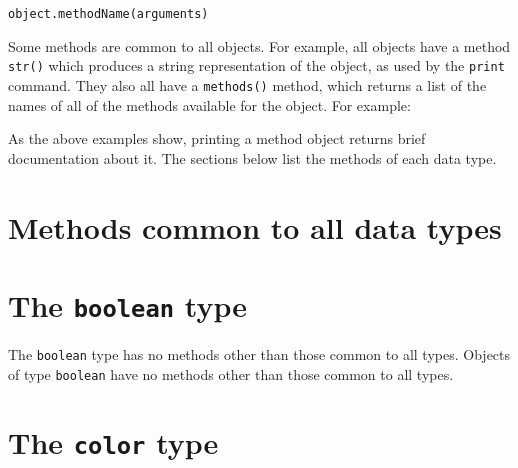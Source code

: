 \begin{verbatim}
object.methodName(arguments)
\end{verbatim}

\noindent Some methods are common to all objects. For example, all objects have
a method {\tt str()} which produces a string representation of the object, as
used by the {\tt print} command. They also all have a {\tt methods()} method,
which returns a list of the names of all of the methods available for the
object. For example:

\vspace{3mm}

\vspace{3mm}

\noindent As the above examples show, printing a method object returns brief
documentation about it. The sections below list the methods of each data type.

\section{Methods common to all data types}
\label{sec:common_methods}


\section{The \texttt{boolean} type}
\label{sec:boolean_methods}

The \texttt{boolean} type has no methods other than those common to all types.
Objects of type \texttt{boolean} have no methods other than those common to all types.

\section{The \texttt{color} type}
\label{sec:color_methods}



